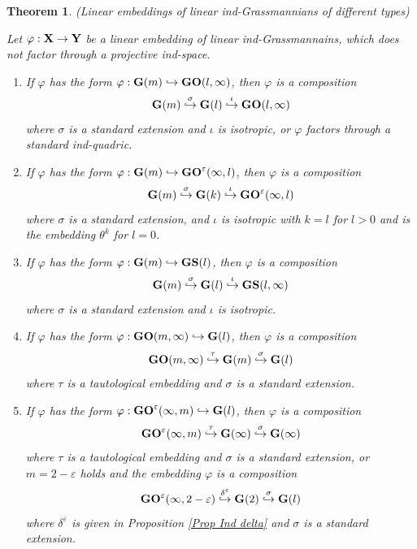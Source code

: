 \documentclass[12pt]{amsart}
\def\eps {\varepsilon}
\def\hw  {\hookrightarrow}
\newtheorem{theorem}{Theorem}[section]
\begin{document}
\begin{theorem}\label{Theo ind Embed Mix Type} {\rm (Linear embeddings of linear ind-Grassmannians of different types)}

Let $\varphi:{\bf X}\to{\bf Y}$ be a linear embedding of linear ind-Grassmannains, which does not factor through a projective ind-space.

\begin{enumerate}
\item[\rm (i.1)] If $\varphi$ has the form $\varphi:{\bf G}(m)\hw {\bf GO}(l,\infty)$, then $\varphi$ is a composition
$$
{\bf G}(m) \stackrel{\sigma}{\hookrightarrow} {\bf G}(l) \stackrel{\iota}{\hookrightarrow} {\bf GO}(l,\infty)
$$
where $\sigma$ is a standard extension and $\iota$ is isotropic, or $\varphi$ factors through a standard ind-quadric.
\item[\rm (i.2)] If $\varphi$ has the form $\varphi:{\bf G}(m)\hw {\bf GO}^\varepsilon(\infty,l)$, then $\varphi$ is a composition
$$
{\bf G}(m) \stackrel{\sigma}{\hookrightarrow} {\bf G}(k) \stackrel{\iota}{\hookrightarrow} {\bf GO}^\varepsilon(\infty,l)
$$
where $\sigma$ is a standard extension, and $\iota$ is isotropic with $k=l$ for $l>0$ and is the embedding $\theta^k$ for $l=0$.
\item[\rm (ii)] If $\varphi$ has the form $\varphi:{\bf G}(m)\hw {\bf GS}(l)$, then $\varphi$ is a composition
$$
{\bf G}(m) \stackrel{\sigma}{\hookrightarrow} {\bf G}(l) \stackrel{\iota}{\hookrightarrow} {\bf GS}(l,\infty)
$$
where $\sigma$ is a standard extension and $\iota$ is isotropic.
\item[\rm (iii.1)] If $\varphi$ has the form $\varphi:{\bf GO}(m,\infty)\hookrightarrow {\bf G}(l)$, then $\varphi$ is a composition
$$
{\bf GO}(m,\infty) \stackrel{\tau}{\hookrightarrow} {\bf G}(m) \stackrel{\sigma}{\hookrightarrow} {\bf G}(l)
$$
where $\tau$ is a tautological embedding and $\sigma$ is a standard extension.
\item[\rm (iii.2)] If $\varphi$ has the form $\varphi:{\bf GO}^\varepsilon(\infty,m)\hookrightarrow {\bf G}(l)$, then $\varphi$ is a composition
$$
{\bf GO}^\varepsilon(\infty,m) \stackrel{\tau}{\hookrightarrow} {\bf G}(\infty) \stackrel{\sigma}{\hookrightarrow} {\bf G}(\infty)
$$
where $\tau$ is a tautological embedding and $\sigma$ is a standard extension, or $m=2-\eps$ holds and the embedding $\varphi$ is a composition
$$
{\bf GO}^\eps(\infty,2-\eps) \stackrel{\delta^\eps}{\hookrightarrow} {\bf G}(2) \stackrel{\sigma}{\hookrightarrow} {\bf G}(l)
$$
where $\delta^\eps$ is given in Proposition \ref{Prop Ind delta} and $\sigma$ is a standard extension.


\end{enumerate}
\end{theorem}
\end{document}
